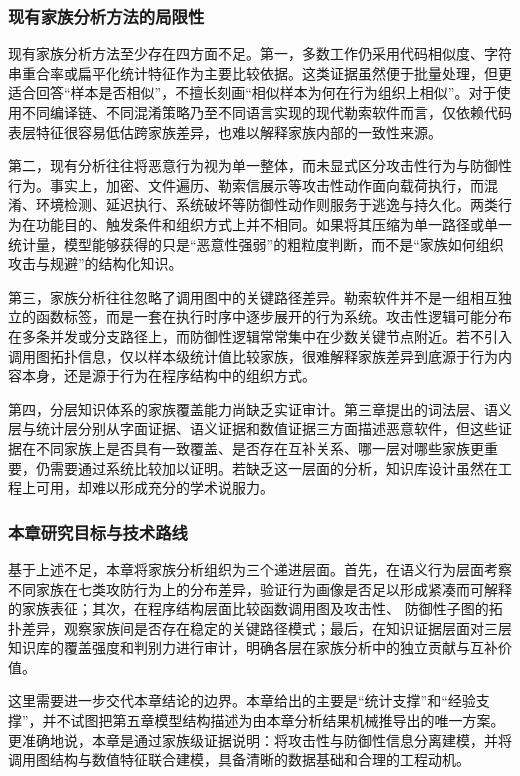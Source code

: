 \subsubsection{现有家族分析方法的局限性}

现有家族分析方法至少存在四方面不足。第一，多数工作仍采用代码相似度、字符串重合率或扁平化统计特征作为主要比较依据。这类证据虽然便于批量处理，但更适合回答“样本是否相似”，不擅长刻画“相似样本为何在行为组织上相似”。对于使用不同编译链、不同混淆策略乃至不同语言实现的现代勒索软件而言，仅依赖代码表层特征很容易低估跨家族差异，也难以解释家族内部的一致性来源。

第二，现有分析往往将恶意行为视为单一整体，而未显式区分攻击性行为与防御性行为。事实上，加密、文件遍历、勒索信展示等攻击性动作面向载荷执行，而混淆、环境检测、延迟执行、系统破坏等防御性动作则服务于逃逸与持久化。两类行为在功能目的、触发条件和组织方式上并不相同。如果将其压缩为单一路径或单一统计量，模型能够获得的只是“恶意性强弱”的粗粒度判断，而不是“家族如何组织攻击与规避”的结构化知识。

第三，家族分析往往忽略了调用图中的关键路径差异。勒索软件并不是一组相互独立的函数标签，而是一套在执行时序中逐步展开的行为系统。攻击性逻辑可能分布在多条并发或分支路径上，而防御性逻辑常常集中在少数关键节点附近。若不引入调用图拓扑信息，仅以样本级统计值比较家族，很难解释家族差异到底源于行为内容本身，还是源于行为在程序结构中的组织方式。

第四，分层知识体系的家族覆盖能力尚缺乏实证审计。第三章提出的词法层、语义层与统计层分别从字面证据、语义证据和数值证据三方面描述恶意软件，但这些证据在不同家族上是否具有一致覆盖、是否存在互补关系、哪一层对哪些家族更重要，仍需要通过系统比较加以证明。若缺乏这一层面的分析，知识库设计虽然在工程上可用，却难以形成充分的学术说服力。

\subsubsection{本章研究目标与技术路线}

基于上述不足，本章将家族分析组织为三个递进层面。首先，在语义行为层面考察不同家族在七类攻防行为上的分布差异，验证行为画像是否足以形成紧凑而可解释的家族表征；其次，在程序结构层面比较函数调用图及攻击性、 防御性子图的拓扑差异，观察家族间是否存在稳定的关键路径模式；最后，在知识证据层面对三层知识库的覆盖强度和判别力进行审计，明确各层在家族分析中的独立贡献与互补价值。

这里需要进一步交代本章结论的边界。本章给出的主要是“统计支撑”和“经验支撑”，并不试图把第五章模型结构描述为由本章分析结果机械推导出的唯一方案。更准确地说，本章是通过家族级证据说明：将攻击性与防御性信息分离建模，并将调用图结构与数值特征联合建模，具备清晰的数据基础和合理的工程动机。

